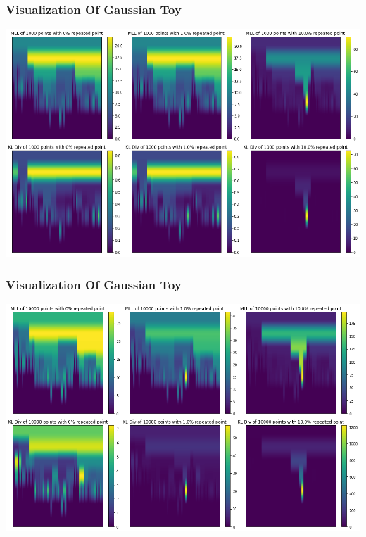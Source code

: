 \documentclass{beamer}
\begin{document}
\begin{frame}
    \frametitle{Visualization Of Gaussian Toy}
    \begin{center}
        \includegraphics[scale=0.3]{tree_val_plot_1000.png}
    \end{center}
\end{frame}

\begin{frame}
    \frametitle{Visualization Of Gaussian Toy}
    \begin{center}
        \includegraphics[scale=0.3]{tree_val_plot_10000.png}
    \end{center}
\end{frame}
\end{document}
